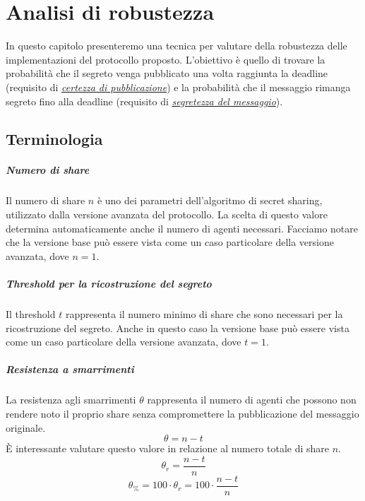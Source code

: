 \chapter{Analisi di robustezza}
\label{chap:analisi-robustezza}
In questo capitolo presenteremo una tecnica per valutare della robustezza delle
implementazioni del protocollo proposto. L'obiettivo è quello di trovare
la probabilità che il segreto venga pubblicato una volta raggiunta la deadline
(requisito di \hyperref[parag:certezza-pubblicazione]{\textit{certezza di pubblicazione}})
e la probabilità che il messaggio rimanga segreto fino alla deadline
(requisito di \hyperref[parag:segretezza-tre]{\textit{segretezza del messaggio}}).

\section{Terminologia}

\paragraph{Numero di share}
Il numero di share $ n $ è uno dei parametri
dell'algoritmo di secret sharing, utilizzato dalla versione
avanzata del protocollo.
La scelta di questo valore determina automaticamente anche il numero di agenti
necessari.
Facciamo notare che la versione base può essere vista come un caso particolare
della versione avanzata, dove $ n = 1 $.

\paragraph{Threshold per la ricostruzione del segreto}
Il threshold $ t $ rappresenta il numero minimo di share che
sono necessari per la ricostruzione del segreto.
Anche in questo caso la versione base può essere vista come un caso particolare
della versione avanzata, dove $ t = 1 $.

\paragraph{Resistenza a smarrimenti}
La resistenza agli smarrimenti $ \theta $ rappresenta
il numero di agenti che possono non
rendere noto il proprio share senza compromettere la pubblicazione del messaggio
originale.
$$ \theta = n - t $$
È interessante valutare questo valore in relazione
al numero totale di share $ n $.
$$ \theta_r = \frac{n - t}{n} $$
$$ \theta_\% = 100 \cdot \theta_r = 100 \cdot \frac{n - t}{n} $$


